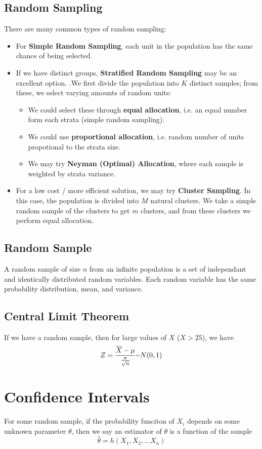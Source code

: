 \documentclass[12pt]{article}
\begin{document}
\subsection*{Random Sampling}
There are many common types of random sampling:
\begin{itemize}
\item For {\bf Simple Random Sampling}, each unit in the population has the same chance of being selected.
\item If we have distinct groups, {\bf Stratified Random Sampling} may be an excellent option. .We first divide the population into $K$ distinct samples; from these, we select varying amounts of random units:
\begin{itemize}
\item We could select these through {\bf equal allocation}, i.e. an equal number form each strata (simple random sampling).
\item We could use {\bf proportional allocation}, i.e. random number of units propotional to the strata size.
\item We may try {\bf Neyman (Optimal) Allocation}, where each sample is weighted by strata variance.
\end{itemize}
\item For a low cost / more efficient solution, we may try {\bf Cluster Sampling}. In this case, the population is divided into $M$ natural clusters. We take a simple random sample of the clusters to get $m$ clusters, and from these clusters we perform equal allocation.
\end{itemize}

\subsection*{Random Sample}
A random sample of size $n$ from an infinite population is a set of independant and identically distributed random variables. Each random variable has the same probability distribution, mean, and variance.

\subsection*{Central Limit Theorem}
If we have a random sample, then for large values of $X$ ($X > 25$), we have \[ Z = \frac{\overline{X} - \mu}{\frac{\sigma}{\sqrt{n}}} \ttilde N(0,1) \]

\section*{Confidence Intervals}
For some random sample, if the probability funciton of $X_i$ depends on some unknown parameter $\theta$, then we say an estimator of $\theta$ is a function of the sample \[ \hat{\theta} = h(X_1, X_2, ... X_n) \]
\end{document}

